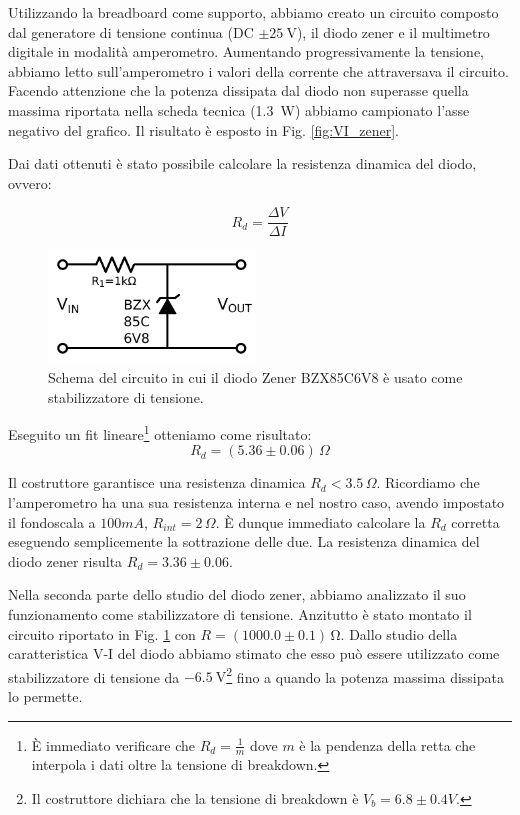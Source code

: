 Utilizzando la breadboard come supporto, abbiamo creato un circuito composto dal generatore di tensione continua (DC $\pm \SI{25}{\volt}$), il diodo zener e il multimetro digitale in modalità amperometro.
\newpage
Aumentando progressivamente la tensione, abbiamo letto sull'amperometro i valori della corrente che attraversava il circuito.
Facendo attenzione che la potenza dissipata dal diodo non superasse quella massima riportata nella scheda tecnica (\SI{1.3}{\watt}) abbiamo campionato l'asse negativo del grafico. Il risultato è esposto in Fig. \ref{fig:VI_zener}.

Dai dati ottenuti è stato possibile calcolare la resistenza dinamica del diodo, ovvero:

\begin{equation}
R_d=\frac{\Delta V}{\Delta I}
\label{scemopagliaccio}
\end{equation}

\begin{figure}
	\includegraphics[width=55mm]{schema_zener.pdf}
	\caption{Schema del circuito in cui il diodo Zener BZX85C6V8 è usato come stabilizzatore di tensione.}
	\label{fig:schema_zener}
\end{figure}

Eseguito un fit lineare\footnote{È immediato verificare che $R_d=\frac{1}{m}$ dove $m$ è la pendenza della retta che interpola i dati oltre la tensione di breakdown.} otteniamo come risultato:
$$R_d= (5.36 \pm 0.06)\,\Omega$$

Il costruttore garantisce una resistenza dinamica $R_d<3.5 \, \Omega$. Ricordiamo che l'amperometro ha una sua resistenza interna e nel nostro caso, avendo impostato il fondoscala a $100mA$, $R_{int}=2\, \Omega$. È dunque immediato calcolare la $R_d$ corretta eseguendo semplicemente la sottrazione delle due. La resistenza dinamica del diodo zener risulta $R_d=3.36 \pm 0.06$.

Nella seconda parte dello studio del diodo zener, abbiamo analizzato il suo funzionamento come stabilizzatore di tensione. Anzitutto è stato montato il circuito riportato in Fig. \ref{fig:schema_zener} con $R = (1000.0 \pm 0.1) \, \si{\ohm}$.  Dallo studio della caratteristica V-I del diodo abbiamo stimato che esso può essere utilizzato come stabilizzatore di tensione da $\SI{-6.5}{\volt}$\footnote{Il costruttore dichiara che la tensione di breakdown è $V_b=6.8 \pm 0.4 V$.} fino a quando la potenza massima dissipata lo permette. 

